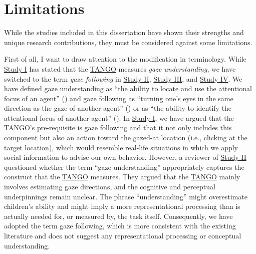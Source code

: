 \documentclass[
]{scrbook}
\begin{document}
\section{Limitations}\label{limitations}

While the studies included in this dissertation have shown their strengths and unique research contributions, they must be considered against some limitations.

First of all, I want to draw attention to the modification in terminology. While \hyperref[studyI]{Study I} has stated that the \hyperref[acronyms_TANGO]{TANGO} measures \emph{gaze understanding}, we have switched to the term \emph{gaze following} in \hyperref[studyII]{Study II}, \hyperref[studyIII]{Study III}, and \hyperref[studyIV]{Study IV}. We have defined gaze understanding as ``the ability to locate and use the attentional focus of an agent'' () and gaze following as ``turning one's eyes in the same direction as the gaze of another agent'' () or as ``the ability to identify the attentional focus of another agent'' (). In \hyperref[studyI]{Study I}, we have argued that the \hyperref[acronyms_TANGO]{TANGO}'s pre-requisite is gaze following and that it not only includes this component but also an action toward the gazed-at location (i.e., clicking at the target location), which would resemble real-life situations in which we apply social information to advise our own behavior. However, a reviewer of \hyperref[studyII]{Study II} questioned whether the term ``gaze understanding'' appropriately captures the construct that the \hyperref[acronyms_TANGO]{TANGO} measures. They argued that the \hyperref[acronyms_TANGO]{TANGO} mainly involves estimating gaze directions, and the cognitive and perceptual underpinnings remain unclear. The phrase ``understanding'' might overestimate children's ability and might imply a more representational processing than is actually needed for, or measured by, the task itself. Consequently, we have adopted the term gaze following, which is more consistent with the existing literature and does not suggest any representational processing or conceptual understanding.
\end{document}
